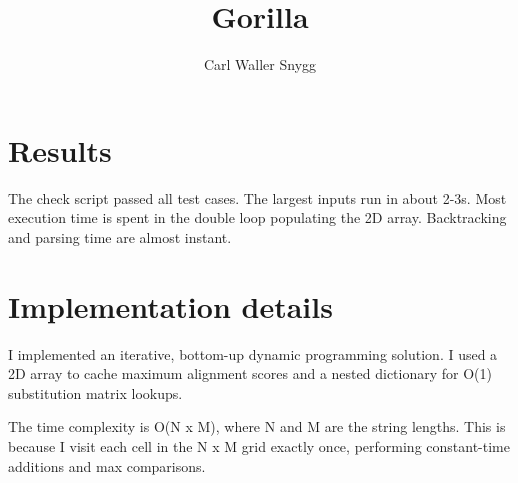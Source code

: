 \documentclass{article}
\title{Gorilla}
\author{Carl Waller Snygg}
\begin{document}
  \maketitle

  \section{Results}

  The check script passed all test cases. The largest inputs run in about 2-3s. Most execution time is spent in the double loop populating the 2D array. Backtracking and parsing time are almost instant.

  \section{Implementation details}

  I implemented an iterative, bottom-up dynamic programming solution. I used a 2D array to cache maximum alignment scores and a nested dictionary for O(1) substitution matrix lookups. 
  
  The time complexity is O(N x M), where N and M are the string lengths. This is because I visit each cell in the N x M grid exactly once, performing constant-time additions and max comparisons.
  
\end{document}
